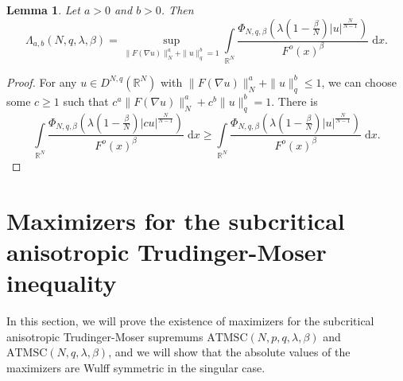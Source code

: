 \documentclass[11pt]{article}
\theoremstyle{plain}
\newtheorem{lemma}[theorem]{Lemma}
\numberwithin{equation}{section}
\newcommand{\R}{\mathbb{R}}
\begin{document}
\begin{lemma}\label{le2.6}
Let $a>0$ and $b>0$. Then
$$
\Lambda_{a,b}(N,q,\lambda,\beta)=\sup\limits_{\|F(\nabla u)\|_{N}^{a}+\|u\|_{q}^{b}=1}\int\limits_{\R^{N}}\frac{\Phi_{N,q,\beta}(\lambda(1-\frac{\beta}{N})\lvert u\rvert^{\frac{N}{N-1}})}{F^{o}(x)^{\beta}}\;\mathrm{d}x.
$$
\end{lemma}
\begin{proof}
For any $u\in D^{N,q}(\R^{N})$ with $\|F(\nabla u)\|_{N}^{a}+\|u\|_{q}^{b}\leq1$, we can choose some $c\geq1$ such that $c^{a}\|F(\nabla u)\|_{N}^{a}+c^{b}\|u\|_{q}^{b}=1$. There is
$$
\int\limits_{\R^{N}}\frac{\Phi_{N,q,\beta}(\lambda(1-\frac{\beta}{N})\lvert cu\rvert^{\frac{N}{N-1}})}{F^{o}(x)^{\beta}}\;\mathrm{d}x\geq\int\limits_{\R^{N}}\frac{\Phi_{N,q,\beta}(\lambda(1-\frac{\beta}{N})\lvert u\rvert^{\frac{N}{N-1}})}{F^{o}(x)^{\beta}}\;\mathrm{d}x.
$$
\end{proof}


















\section{Maximizers for the subcritical anisotropic Trudinger-Moser inequality}\label{section3}

In this section, we will prove the existence of maximizers for the subcritical anisotropic Trudinger-Moser supremums $\mathrm{ATMSC}(N,p,q,\lambda,\beta)$ and $\mathrm{ATMSC}(N,q,\lambda,\beta)$, and we will show that the absolute values of the maximizers are Wulff symmetric in the singular case.
\end{document}
